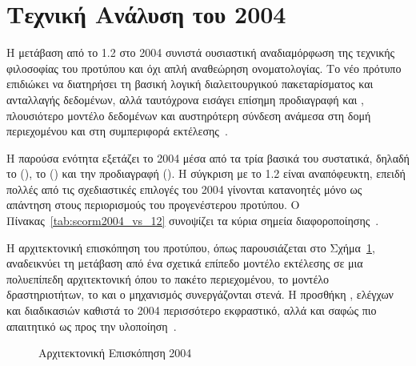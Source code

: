 \section{Τεχνική Ανάλυση του  2004}
\label{sec:scorm2004_analysis}
\label{sec:scorm2004_technical}

Η μετάβαση από το  1.2 στο  2004 συνιστά ουσιαστική αναδιαμόρφωση της τεχνικής φιλοσοφίας του προτύπου και όχι απλή αναθεώρηση ονοματολογίας. Το νέο πρότυπο επιδιώκει να διατηρήσει τη βασική λογική διαλειτουργικού πακεταρίσματος και ανταλλαγής δεδομένων, αλλά ταυτόχρονα εισάγει επίσημη προδιαγραφή  και , πλουσιότερο μοντέλο δεδομένων και αυστηρότερη σύνδεση ανάμεσα στη δομή περιεχομένου και στη συμπεριφορά εκτέλεσης~\cite{ADL_SCORM2004_CAM, ADL_SCORM_Users_Guide, IMS_SimpleSequencing}.

Η παρούσα ενότητα εξετάζει το  2004 μέσα από τα τρία βασικά του συστατικά, δηλαδή το  (), το  () και την προδιαγραφή  (). Η σύγκριση με το  1.2 είναι αναπόφευκτη, επειδή πολλές από τις σχεδιαστικές επιλογές του  2004 γίνονται κατανοητές μόνο ως απάντηση στους περιορισμούς του προγενέστερου προτύπου. Ο Πίνακας~\ref{tab:scorm2004_vs_12} συνοψίζει τα κύρια σημεία διαφοροποίησης~\cite{SCORM_Comparison_Guide, Rustici_SCORM_Versions}.

\begin{table}[htbp]
\centering
\caption{Σύγκριση  1.2 και  2004}
\label{tab:scorm2004_vs_12}

\end{table}

Η αρχιτεκτονική επισκόπηση του προτύπου, όπως παρουσιάζεται στο Σχήμα~\ref{fig:scorm2004_architecture}, αναδεικνύει τη μετάβαση από ένα σχετικά επίπεδο μοντέλο εκτέλεσης σε μια πολυεπίπεδη αρχιτεκτονική όπου το πακέτο περιεχομένου, το μοντέλο δραστηριοτήτων, το  και ο μηχανισμός  συνεργάζονται στενά. Η προσθήκη , ελέγχων  και διαδικασιών  καθιστά το  2004 περισσότερο εκφραστικό, αλλά και σαφώς πιο απαιτητικό ως προς την υλοποίηση~\cite{ADL_SCORM2004_Testing, SCORM_Technical_Overview}.

\begin{figure}[htbp]
\centering

\caption{Αρχιτεκτονική Επισκόπηση  2004}
\label{fig:scorm2004_architecture}
\end{figure}

